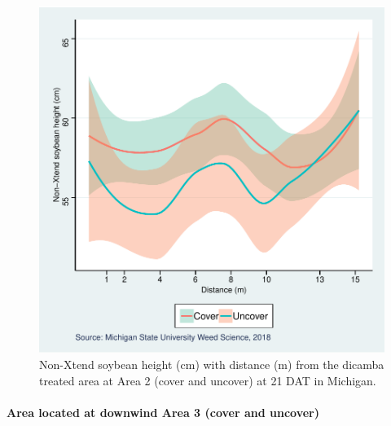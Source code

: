 \documentclass[]{article}
\let\oldparagraph\paragraph
\renewcommand{\paragraph}[1]{\oldparagraph{#1}\mbox{}}
\begin{document}
\begin{figure}
\centering
\includegraphics{Report_files/figure-latex/unnamed-chunk-62-1.pdf}
\caption{Non-Xtend soybean height (cm) with distance (m) from the
dicamba treated area at Area 2 (cover and uncover) at 21 DAT in
Michigan.}
\end{figure}

\pagebreak
\newpage

\paragraph{Area located at downwind Area 3 (cover and
uncover)}\label{area-located-at-downwind-area-3-cover-and-uncover-1}
\end{document}
